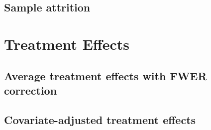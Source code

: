 \documentclass[11pt]{article}
\begin{document}
        
        
        
        

	\clearpage

    \subsection{Sample attrition}

        
        
        

    \clearpage

\section{Treatment Effects}


    \subsection{Average treatment effects with FWER correction}

        
        
        
        
        
        
        
        
        

    \clearpage

    \subsection{Covariate-adjusted treatment effects}
\end{document}
